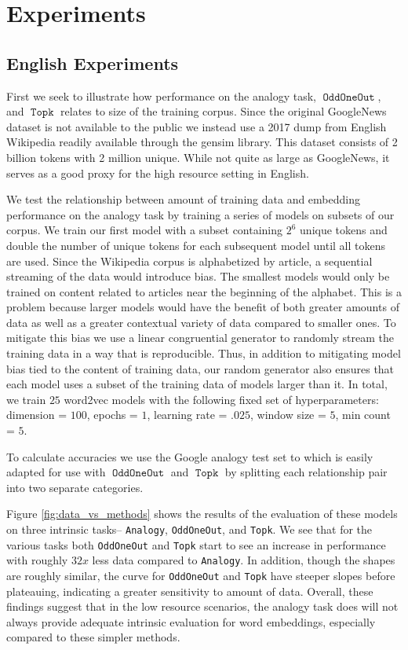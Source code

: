 \documentclass[11pt,a4paper]{article}
\DeclareMathOperator{\OddOneOut}{\texttt{OddOneOut}}
\DeclareMathOperator{\topk}{\texttt{Topk}}
\begin{document}
\section{Experiments}
\label{sec:experiments}
\subsection{English Experiments}


First we seek to illustrate how performance on the analogy task, $\OddOneOut$, and $\topk$ relates to size of the training corpus. 
Since the original GoogleNews dataset is not available to the public we instead use a 2017 dump from English Wikipedia readily available through the gensim library.
 This dataset consists of 2 billion tokens with 2 million unique.
 While not quite as large as GoogleNews, it serves as a good proxy for the high resource setting in English.

We test the relationship between amount of training data and embedding performance on the analogy task by training a series of models on subsets of our corpus.
 We train our first model with a subset containing $2^{6}$ unique tokens and double the number of unique tokens for each subsequent model until all tokens are used. 
 Since the Wikipedia corpus is alphabetized by article, a sequential streaming of the data would introduce bias. The smallest models would only be trained on content related to articles near the beginning of the alphabet.
 This is a problem because larger models would have the benefit of both greater amounts of data as well as a greater contextual variety of data compared to smaller ones. 
 To mitigate this bias we use a linear congruential generator to randomly stream the training data in a way that is reproducible. 
 Thus, in addition to mitigating model bias tied to the content of training data, our random generator also ensures that each model uses a subset of the training data of models larger than it.
  In total, we train $25$ word2vec models with the following fixed set of hyperparameters: dimension = $100$, epochs = $1$, learning rate = $.025$, window size = $5$, min count = $5$.

To calculate accuracies we use the Google analogy test set to which is easily adapted for use with $\OddOneOut$ and $\topk$ by splitting each relationship pair into two separate categories.

Figure \ref{fig:data_vs_methods} shows the results of the evaluation of these models on three intrinsic tasks-- \texttt{Analogy}, \texttt{OddOneOut}, and \texttt{Topk}.
 We see that for the various tasks both \texttt{OddOneOut} and \texttt{Topk} start to see an increase in performance with roughly $32x$ less data compared to \texttt{Analogy}. 
 In addition, though the shapes are roughly similar, the curve for \texttt{OddOneOut} and \texttt{Topk} have steeper slopes before plateauing, 
 indicating a greater sensitivity to amount of data.
  Overall, these findings suggest that in the low resource scenarios, the analogy task does will not always provide adequate intrinsic evaluation for word embeddings,
  especially compared to these simpler methods.
\end{document}
